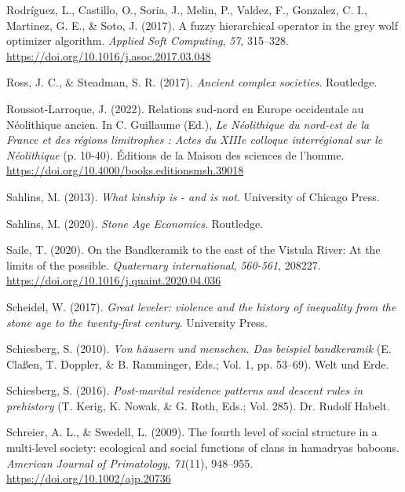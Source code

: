\documentclass[
  12pt,
]{book}
\newlength{\cslhangindent}
\newlength{\cslentryspacingunit} %
\newenvironment{CSLReferences}[2] %
 {%
  \setlength{\parindent}{0pt}
  \ifodd #1
  \let\oldpar\par
  \def\par{\hangindent=\cslhangindent\oldpar}
  \fi
  \setlength{\parskip}{#2\cslentryspacingunit}
 }%
 {}
\begin{document}
\begin{CSLReferences}{1}{0}
\leavevmode{}%
Rodríguez, L., Castillo, O., Soria, J., Melin, P., Valdez, F., Gonzalez, C. I., Martinez, G. E., \& Soto, J. (2017). A fuzzy hierarchical operator in the grey wolf optimizer algorithm. \emph{Applied Soft Computing}, \emph{57}, 315--328. \url{https://doi.org/10.1016/j.asoc.2017.03.048}

\leavevmode{}%
Ross, J. C., \& Steadman, S. R. (2017). \emph{Ancient complex societies}. Routledge.

\leavevmode{}%
Roussot‑Larroque, J. (2022). Relations sud‑nord en Europe occidentale au Néolithique ancien. In C. Guillaume (Ed.), \emph{Le Néolithique du nord-est de la France et des régions limitrophes : Actes du XIIIe colloque interrégional sur le Néolithique} (p. 10‑40). {Éditions de la Maison des sciences de l'homme}. \url{https://doi.org/10.4000/books.editionsmsh.39018}

\leavevmode{}%
Sahlins, M. (2013). \emph{What kinship is - and is not}. University of Chicago Press.

\leavevmode{}%
Sahlins, M. (2020). \emph{Stone Age Economics}. Routledge.

\leavevmode{}%
Saile, T. (2020). On the Bandkeramik to the east of the Vistula River: At the limits of the possible. \emph{Quaternary international}, \emph{560-561}, 208227. \url{https://doi.org/10.1016/j.quaint.2020.04.036}

\leavevmode{}%
Scheidel, W. (2017). \emph{Great leveler: violence and the history of inequality from the stone age to the twenty-first century}. University Press.

\leavevmode{}%
Schiesberg, S. (2010). \emph{Von häusern und menschen. Das beispiel bandkeramik} (E. Claßen, T. Doppler, \& B. Ramminger, Eds.; Vol. 1, pp. 53--69). Welt und Erde.

\leavevmode{}%
Schiesberg, S. (2016). \emph{Post-marital residence patterns and descent rules in prehistory} (T. Kerig, K. Nowak, \& G. Roth, Eds.; Vol. 285). Dr. Rudolf Habelt.

\leavevmode{}%
Schreier, A. L., \& Swedell, L. (2009). The fourth level of social structure in a multi-level society: ecological and social functions of clans in hamadryas baboons. \emph{American Journal of Primatology}, \emph{71}(11), 948--955. \url{https://doi.org/10.1002/ajp.20736}


\end{CSLReferences}
\end{document}
